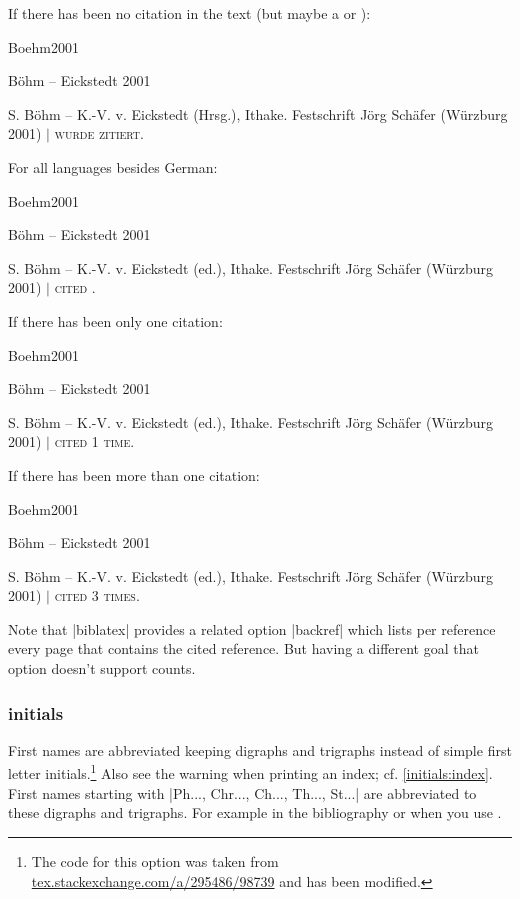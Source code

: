 \documentclass[a4paper,
10pt,
greek,
french,
spanish,
italian,
ngerman,
english,
]{ltxdoc}
\begin{document}
If there has been no citation in the text (but maybe a  or ):
\begin{bibbox}{Boehm2001}\footnotesize
\parbox[t]{3cm}{Böhm – Eickstedt 2001} \parbox[t]{8cm}{%
S. Böhm – K.-V. v. Eickstedt (Hrsg.), Ithake. Festschrift Jörg Schäfer (Würzburg 2001)  $\vert$  {\scshape  wurde {\color{red}{keinmal}} zitiert.}}
\end{bibbox} 

For all languages besides German:
\begin{bibbox}{Boehm2001}\footnotesize
\parbox[t]{3cm}{Böhm – Eickstedt 2001} \parbox[t]{8cm}{%
S. Böhm – K.-V. v. Eickstedt (ed.), Ithake. Festschrift Jörg Schäfer (Würzburg 2001) $\vert$  {\scshape cited {{\color{red}{not once}}}.}}
\end{bibbox}
  
If there has been only one citation:
\begin{bibbox}{Boehm2001}\footnotesize
\parbox[t]{3cm}{Böhm – Eickstedt 2001} \parbox[t]{8cm}{%
S. Böhm – K.-V. v. Eickstedt (ed.), Ithake. Festschrift Jörg Schäfer (Würzburg 2001) $\vert$  {\scshape cited 1 time.}}
\end{bibbox}

If there has been more than one citation:
\begin{bibbox}{Boehm2001}\footnotesize
\parbox[t]{3cm}{Böhm – Eickstedt 2001} \parbox[t]{8cm}{%
S. Böhm – K.-V. v. Eickstedt (ed.), Ithake. Festschrift Jörg Schäfer (Würzburg 2001) $\vert$  {\scshape cited 3 times.}}
\end{bibbox}

Note that |biblatex| provides a related option |backref| which lists per reference every page 
that contains the cited reference. But having a different goal that option doesn't support counts. 
 
\subsubsection{initials}\label{initials}
First names are abbreviated keeping digraphs and trigraphs instead of simple first letter initials.\footnote{The code for this option was taken from \href{http://tex.stackexchange.com/a/295486/98739}{tex.stackexchange.com/a/295486/98739} and has been modified.}
Also see the warning when printing an index; cf. \cref{initials:index}.
First names starting with |Ph..., Chr..., Ch..., Th..., St...| are abbreviated to these digraphs and trigraphs. For example in the bibliography or when you use .
\end{document}
